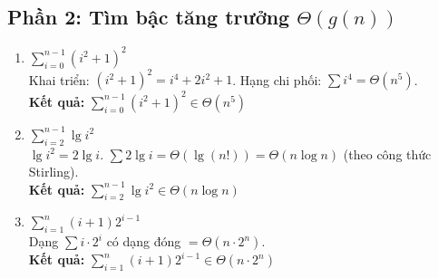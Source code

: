 \documentclass[12pt,a4paper]{article}
\begin{document}
\subsection*{Phần 2: Tìm bậc tăng trưởng $\Theta(g(n))$}

\begin{enumerate}
    \item[a.] $\displaystyle\sum_{i=0}^{n-1}(i^2+1)^2$ \\
    Khai triển: $(i^2+1)^2 = i^4 + 2i^2 + 1$. Hạng chi phối: $\sum i^4 = \Theta(n^5)$. \\
    \textbf{Kết quả:} $\displaystyle\sum_{i=0}^{n-1}(i^2+1)^2 \in \Theta(n^5)$

    \item[b.] $\displaystyle\sum_{i=2}^{n-1}\lg i^2$ \\
    $\lg i^2 = 2\lg i$. $\sum 2\lg i = \Theta(\lg(n!)) = \Theta(n\log n)$ (theo công thức Stirling). \\
    \textbf{Kết quả:} $\displaystyle\sum_{i=2}^{n-1}\lg i^2 \in \Theta(n\log n)$

    \item[c.] $\displaystyle\sum_{i=1}^{n}(i+1)2^{i-1}$ \\
    Dạng $\sum i \cdot 2^i$ có dạng đóng $= \Theta(n \cdot 2^n)$. \\
    \textbf{Kết quả:} $\displaystyle\sum_{i=1}^{n}(i+1)2^{i-1} \in \Theta(n \cdot 2^n)$


\end{enumerate}
\end{document}
